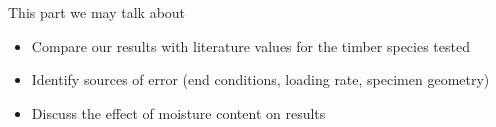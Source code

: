 This part we may talk about
\begin{itemize}
    \item Compare our results with literature values for the timber species tested
    \item Identify sources of error (end conditions, loading rate, specimen geometry)
    \item Discuss the effect of moisture content on results
\end{itemize}